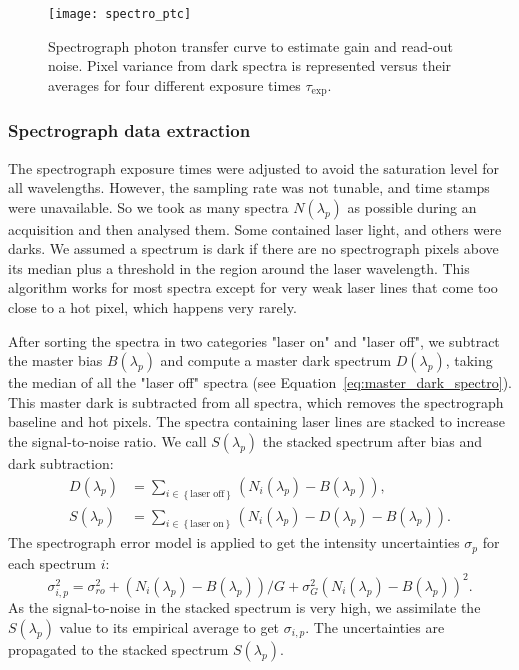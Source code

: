 \begin{figure}[!h]
\centering
\texttt{[image: spectro\_ptc]}
\caption{Spectrograph photon transfer curve to estimate gain and read-out noise. Pixel variance from dark spectra is represented versus their averages for four different exposure times $\tau_{\mathrm{exp}}$.}\label{fig:spectro_ptc}
\end{figure}


\subsubsection{Spectrograph data extraction}


The spectrograph exposure times were adjusted to avoid the saturation level for all wavelengths. However, the sampling rate was not tunable, and time stamps were unavailable. So we took as many spectra $N(\lambda_p)$ as possible during an acquisition and then analysed them. Some contained laser light, and others were darks. We assumed a spectrum is dark if there are no spectrograph pixels above its median plus a threshold in the region around the laser wavelength. This algorithm works for most spectra except for very weak laser lines that come too close to a hot pixel, which happens very rarely.

After sorting the spectra in two categories "laser on" and "laser off", we subtract the master bias $B(\lambda_p)$ and compute a master dark spectrum $D(\lambda_p)$, taking the median of all the "laser off" spectra (see Equation~\ref{eq:master_dark_spectro}). This master dark is subtracted from all spectra, which removes the spectrograph baseline and hot pixels. The spectra containing laser lines are stacked to increase the signal-to-noise ratio. We call $S(\lambda_p)$ the stacked spectrum after bias and dark subtraction:
\begin{align}
\label{eq:master_dark_spectro}
D(\lambda_p) & = \sum_{i \in \left\lbrace \text{laser off}\right\rbrace}\left( N_i(\lambda_p) - B(\lambda_p)\right), \\
    S(\lambda_p) & = \sum_{i \in \left\lbrace \text{laser on}\right\rbrace}\left( N_i(\lambda_p) - D(\lambda_p) - B(\lambda_p)\right).
\end{align}
The spectrograph error model is applied to get the intensity uncertainties $\sigma_p$ for each spectrum $i$:
\begin{equation}\label{eq:spectro_error_model_data}
\sigma^2_{i,p} =\sigma_{ro}^2 +  (N_i(\lambda_p) - B(\lambda_p))/G + \sigma_G^2 (N_i(\lambda_p) - B(\lambda_p))^2.
\end{equation}
As the signal-to-noise in the stacked spectrum is very high, we assimilate the $S(\lambda_p)$ value to its empirical average to get $\sigma_{i,p}$. The uncertainties are propagated to the stacked spectrum $S(\lambda_p)$.

